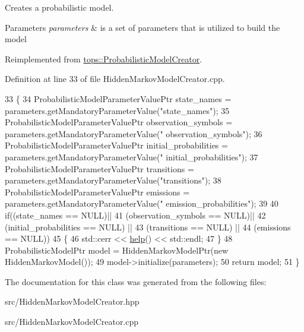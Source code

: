 Creates a probabilistic model. 


\begin{DoxyParams}{Parameters}
{\em parameters} & is a set of parameters that is utilized to build the model \\
\hline
\end{DoxyParams}


Reimplemented from \hyperlink{classtops_1_1ProbabilisticModelCreator_afed6c8ffa45fff446bdaa8b533da8f7c}{tops\+::\+Probabilistic\+Model\+Creator}.



Definition at line 33 of file Hidden\+Markov\+Model\+Creator.\+cpp.


\begin{DoxyCode}
33                                                                                                         \{
34     ProbabilisticModelParameterValuePtr state\_names = parameters.getMandatoryParameterValue(\textcolor{stringliteral}{"state\_names"});
35     ProbabilisticModelParameterValuePtr observation\_symbols = parameters.getMandatoryParameterValue(\textcolor{stringliteral}{"
      observation\_symbols"});
36     ProbabilisticModelParameterValuePtr initial\_probabilities = parameters.getMandatoryParameterValue(\textcolor{stringliteral}{"
      initial\_probabilities"});
37     ProbabilisticModelParameterValuePtr transitions = parameters.getMandatoryParameterValue(\textcolor{stringliteral}{"transitions"});
38     ProbabilisticModelParameterValuePtr emissions = parameters.getMandatoryParameterValue(\textcolor{stringliteral}{"
      emission\_probabilities"});
39 
40     \textcolor{keywordflow}{if}((state\_names == NULL)||
41        (observation\_symbols == NULL)||
42        (initial\_probabilities == NULL) ||
43        (transitions == NULL) ||
44        (emissions == NULL))
45       \{
46         std::cerr << \hyperlink{classtops_1_1HiddenMarkovModelCreator_a9c05006a5d193d6ddc7c851430a3e2b6}{help}() << std::endl;
47       \}
48     ProbabilisticModelPtr model = HiddenMarkovModelPtr(\textcolor{keyword}{new} HiddenMarkovModel());
49     model->initialize(parameters);
50     \textcolor{keywordflow}{return} model;
51   \}
\end{DoxyCode}


The documentation for this class was generated from the following files\+:\begin{DoxyCompactItemize}
\item 
src/Hidden\+Markov\+Model\+Creator.\+hpp\item 
src/Hidden\+Markov\+Model\+Creator.\+cpp\end{DoxyCompactItemize}
